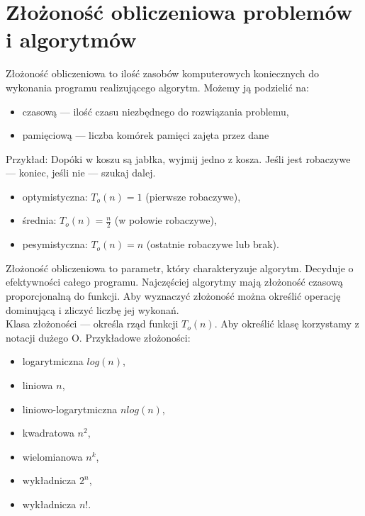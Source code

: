\documentclass[10pt, a
4paper]{article}
\begin{document}
\section{Złożoność obliczeniowa problemów i algorytmów}
	Złożoność obliczeniowa to ilość zasobów komputerowych koniecznych do wykonania programu realizującego algorytm.
    Możemy ją podzielić na:
    \begin{itemize}
    	\item czasową --- ilość czasu niezbędnego do rozwiązania problemu,
    	\item pamięciową --- liczba komórek pamięci zajęta przez dane
    \end{itemize}
    Przykład: Dopóki w koszu są jabłka, wyjmij jedno z kosza. Jeśli jest robaczywe --- koniec, jeśli nie --- szukaj dalej.
    \begin{itemize}
    	\item optymistyczna: $T_o(n)=1$ (pierwsze robaczywe),
    	\item średnia: $T_o(n)=\frac{n}{2}$ (w połowie robaczywe),
    	\item pesymistyczna: $T_o(n)=n$ (ostatnie robaczywe lub brak).
    \end{itemize}
    Złożoność obliczeniowa to parametr, który charakteryzuje algorytm. Decyduje o efektywności całego programu.
    Najczęściej algorytmy mają złożoność czasową proporcjonalną do funkcji. Aby wyznaczyć złożoność można określić
    operację dominującą i zliczyć liczbę jej wykonań.\\
    Klasa złożoności --- określa rząd funkcji $T_o(n)$. Aby określić klasę korzystamy z notacji dużego O.
    Przykładowe złożoności:
    \begin{itemize}
    	\item logarytmiczna $log(n)$,
    	\item liniowa $n$,
    	\item liniowo-logarytmiczna $nlog(n)$,
    	\item kwadratowa $n^2$,
    	\item wielomianowa $n^k$,
    	\item wykładnicza $2^n$,
    	\item wykładnicza $n!$.
    \end{itemize}
\end{document}
